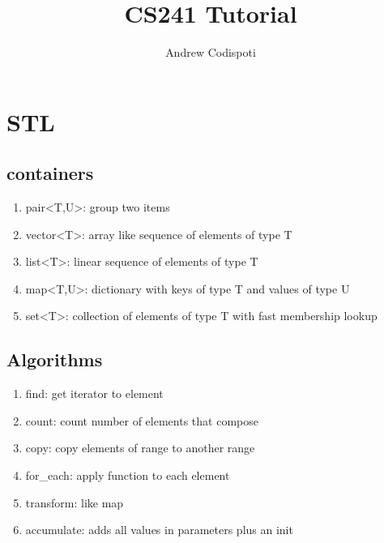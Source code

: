 \documentclass[11pt]{amsart}
\title{CS241 Tutorial}
\author{Andrew Codispoti}
\begin{document}
\maketitle
\section{STL}
\subsection{containers}
\begin{enumerate}
    \item pair<T,U>: group two items
    \item vector<T>: array like sequence of elements of type T
    \item list<T>: linear sequence of elements of type T
    \item map<T,U>: dictionary with keys of type T and values of type U
    \item set<T>: collection of elements of type T with fast membership lookup
\end{enumerate}
\subsection{Algorithms}
\begin{enumerate}
    \item find: get iterator to element
    \item count: count number of elements that compose
    \item copy: copy elements of range to another range
    \item for\_each: apply function to each element
    \item transform: like map 
    \item accumulate: adds all values in parameters plus an init
\end{enumerate}
\end{document}
